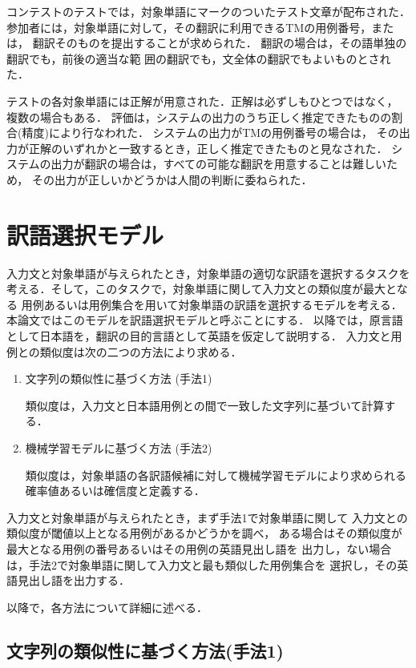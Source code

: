 コンテストのテストでは，対象単語にマークのついたテスト文章が配布された．
参加者には，対象単語に対して，その翻訳に利用できるTMの用例番号，または，
翻訳そのものを提出することが求められた．
翻訳の場合は，その語単独の翻訳でも，前後の適当な範
囲の翻訳でも，文全体の翻訳でもよいものとされた．

テストの各対象単語には正解が用意された．正解は必ずしもひとつではなく，
複数の場合もある．
評価は，システムの出力のうち正しく推定できたものの割合(精度)により行なわれた．
システムの出力がTMの用例番号の場合は，
その出力が正解のいずれかと一致するとき，正しく推定できたものと見なされた．
システムの出力が翻訳の場合は，すべての可能な翻訳を用意することは難しいため，
その出力が正しいかどうかは人間の判断に委ねられた．

\section{訳語選択モデル}
\label{sec:model}

入力文と対象単語が与えられたとき，対象単語の適切な訳語を選択するタスクを
考える．そして，このタスクで，対象単語に関して入力文との類似度が最大となる
用例あるいは用例集合を用いて対象単語の訳語を選択するモデルを考える．
本論文ではこのモデルを訳語選択モデルと呼ぶことにする．
以降では，原言語として日本語を，翻訳の目的言語として英語を仮定して説明する．
入力文と用例との類似度は次の二つの方法により求める．
\begin{enumerate}
\item 文字列の類似性に基づく方法 (手法1)

  類似度は，入力文と日本語用例との間で一致した文字列に基づいて計算する．

\item 機械学習モデルに基づく方法 (手法2)

  類似度は，対象単語の各訳語候補に対して機械学習モデルにより求められる
  確率値あるいは確信度と定義する．

\end{enumerate}

入力文と対象単語が与えられたとき，まず手法1で対象単語に関して
入力文との類似度が閾値以上となる用例があるかどうかを調べ，
ある場合はその類似度が最大となる用例の番号あるいはその用例の英語見出し語を
出力し，ない場合は，手法2で対象単語に関して入力文と最も類似した用例集合を
選択し，その英語見出し語を出力する．

以降で，各方法について詳細に述べる．

\subsection{文字列の類似性に基づく方法(手法1)}
\label{sec:metho1}

